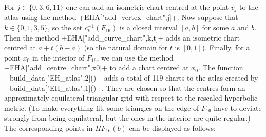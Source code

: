 \documentclass[reqno]{amsart}
\renewcommand{\:}{\colon}
\theoremstyle{definition}
\begin{document}
For $j\in\{0,3,6,11\}$ one can add an isometric chart centred at the
point $v_j$ to the atlas using the method
\mcode+EHA["add_vertex_chart",j]+.  Now suppose that
$k\in\{0,1,3,5\}$, so the set $c_k^{-1}(F_{16})$ is a closed interval
$[a,b]$ for some $a$ and $b$.  Then the method
\mcode+EHA["add_curve_chart",k,t]+ adds an isometric chart centred at
$a+t(b-a)$ (so the natural domain for $t$ is $[0,1]$).  Finally, for a
point $x_0$ in the interior of $F_{16}$, we can use the method
\mcode+EHA["add_centre_chart",x0]+ to add a chart centred at $x_0$.
The function \mcode+build_data["EH_atlas",2]()+ adds a total of 119
charts to the atlas created by \mcode+build_data["EH_atlas",1]()+.
They are chosen so that the centres form an approximately equilateral
triangular grid with respect to the rescaled hyperbolic metric.  (To
make everything fit, some triangles on the edge of $F_{16}$ have to
deviate strongly from being equilateral, but the ones in the interior
are quite regular.)  The corresponding points in $HF_{16}(b)$ can be
displayed as follows: 
\end{document}
